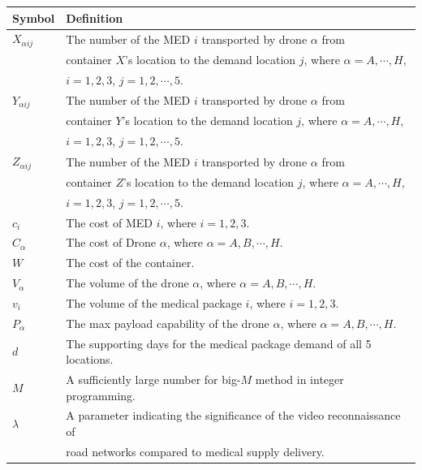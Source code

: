 \documentclass{mcmthesis}
\begin{document}
\begin{tabular}{ll}
	\hline
	Symbol&  Definition\\
	\hline	 
		$X_{\alpha ij}$& The number of the MED $i$ transported by drone $\alpha$ from\\	 
	& container $X$'s location to the demand location $j$, where $\alpha=A,\cdots,H$,\\ 
	& $i=1,2,3$, $j=1,2,\cdots,5$.\\
	
	$Y_{\alpha ij}$& The number of the MED $i$ transported by drone $\alpha$ from \\
	&container $Y$'s location to the demand location $j$, where $\alpha=A,\cdots,H$,\\
	& $i=1,2,3$, $j=1,2,\cdots,5$.\\
	$Z_{\alpha ij}$& The number of the MED $i$ transported by drone $\alpha$ from \\
	&container $Z$'s location to the demand location $j$, where $\alpha=A,\cdots,H$,\\ 
	&$i=1,2,3$, $j=1,2,\cdots,5$.\\
	
		$c_i$& The cost of MED $i$, where $i=1,2,3$.\\
	
	$C_\alpha$& The cost of Drone $\alpha$, where $\alpha=A,B,\cdots,H$.\\
	
	$W$& The cost of the container.\\
	
	$V_\alpha$& The volume of the drone $\alpha$, where $\alpha=A,B,\cdots,H$.\\
	
	$v_i$& The volume of the medical package $i$, where $i=1,2,3$.\\
	
	$P_\alpha$& The max payload capability of the drone $\alpha$, where $\alpha=A,B,\cdots,H$.\\
	
	$d$& The supporting days for the medical package demand of all 5 locations.\\
	
	$M$& A sufficiently large number for big-$M$ method in integer programming.\\
	 $\lambda$& A parameter indicating the significance of the video reconnaissance of\\
	 & road networks compared to medical supply delivery. \\
	 

\end{tabular}
\end{document}
